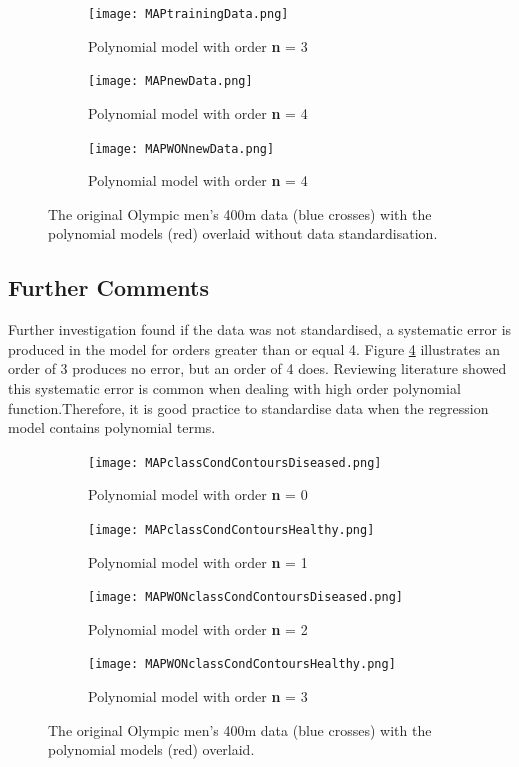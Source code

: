 {{	\begin{figure}[h!] 
		\centering
		\begin{subfigure}[b]{0.4\textwidth}
			\texttt{[image: MAPtrainingData.png]}
			\caption{Polynomial model with order \textbf{n} = 3}
			\label{fig:modelNoReg0}
		\end{subfigure}
		\begin{subfigure}[b]{0.4\textwidth}
			\texttt{[image: MAPnewData.png]}
			\caption{Polynomial model with order \textbf{n} = 4}
			\label{fig:modelNoReg1}
		\end{subfigure}
		\begin{subfigure}[b]{0.4\textwidth}
			\texttt{[image: MAPWONnewData.png]}
			\caption{Polynomial model with order \textbf{n} = 4}
			\label{fig:modelNoReg1}
		\end{subfigure}
		\caption{The original Olympic men's 400m data (blue crosses) with the polynomial models (red) overlaid without data standardisation.}
		\label{men400-1noSt}
	\end{figure}
	
	\subsection{Further Comments}
	Further investigation found if the data was not standardised, a systematic error is produced in the model for orders greater than or equal 4. Figure \ref{men400-1noSt} illustrates an order of 3 produces no error, but an order of 4 does. Reviewing literature showed this systematic error is common when dealing with high order polynomial function\cite{WhenIsIt}.Therefore, it is good practice to standardise data when the regression model contains polynomial terms.
	
	\begin{figure}[h!] 
		\centering
		\begin{subfigure}[b]{0.4\textwidth}
			\texttt{[image: MAPclassCondContoursDiseased.png]}
			\caption{Polynomial model with order \textbf{n} = 0}
			\label{fig:model0}
		\end{subfigure}
		\begin{subfigure}[b]{0.4\textwidth}
			\texttt{[image: MAPclassCondContoursHealthy.png]}
			\caption{Polynomial model with order \textbf{n} = 1}
			\label{fig:model1}
		\end{subfigure}
		\begin{subfigure}[b]{0.4\textwidth}
			\texttt{[image: MAPWONclassCondContoursDiseased.png]}
			\caption{Polynomial model with order \textbf{n} = 2}
			\label{fig:model2}
		\end{subfigure}
		\begin{subfigure}[b]{0.4\textwidth}
			\texttt{[image: MAPWONclassCondContoursHealthy.png]}
			\caption{Polynomial model with order \textbf{n} = 3}
			\label{fig:model3}
		\end{subfigure}
		\caption{The original Olympic men's 400m data (blue crosses) with the polynomial models (red) overlaid.}
		\label{men400-1}
	\end{figure}
	
}}
